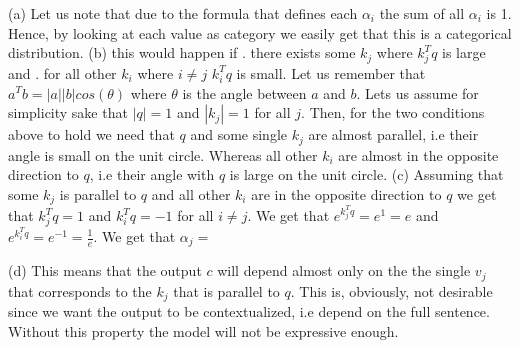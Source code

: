 (a) \newline
Let us note that due to the formula that defines each $\alpha_i$ the sum of all $\alpha_i$ is 1. 
Hence, by looking at each value as category we easily get that this is a categorical distribution. \newline
(b) \newline
this would happen if . there exists some $k_j$ where $k_j^Tq$ is large and . for all other $k_i$ where $i \neq j$ $k_i^Tq$ is small. \newline
Let us remember that $a^Tb = |a||b|cos(\theta)$ where $\theta$ is the angle between $a$ and $b$. Lets us assume for simplicity sake that $|q| = 1$ and $|k_j| = 1$ for all $j$. \newline
Then, for the two conditions above to hold we need that $q$ and some single $k_j$ are almost parallel, i.e their angle is small on the unit circle. 
Whereas all other $k_i$ are almost in the opposite direction to $q$, i.e their angle with $q$ is large on the unit circle. \newline
(c) \newline
Assuming that some $k_j$ is parallel to $q$ and all other $k_i$ are in the opposite direction to $q$ we get that $k_j^Tq = 1$ and $k_i^Tq = -1$ for all $i \neq j$. \newline
We get that $e^{k_j^Tq} = e^1 = e$ and $e^{k_i^Tq} = e^{-1} = \frac{1}{e}$. \newline
We get that $\alpha_j=$



(d) \newline
This means that the output $c$ will depend almost only on the the single $v_j$ that corresponds to the $k_j$ that is parallel to $q$. 
This is, obviously, not desirable since we want the output to be contextualized, i.e depend on the full sentence. Without this property the model will not be expressive enough.